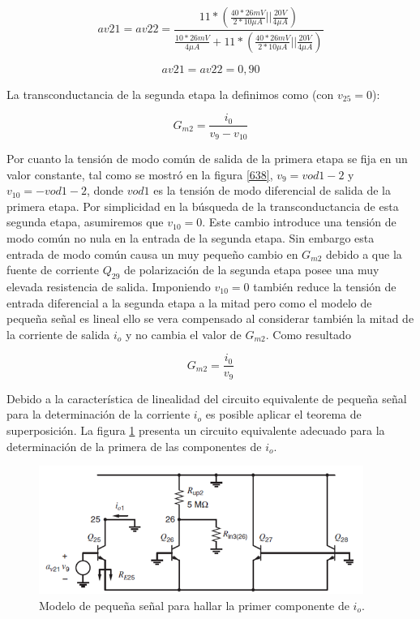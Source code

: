 \documentclass[12pt,a4paper,final,headinclude,footinclude,BCOR5mm]{scrartcl}
\begin{document}
$$av21 = av22 = \frac{11 * (\frac{40*26mV}{2*10 \mu A}||\frac{20V}{4 \mu A})}{\frac{10*26 mV}{4 \mu A} + 11 * (\frac{40*26mV}{2*10 \mu A}||\frac{20V}{4 \mu A})}$$

$$av21 = av22 = 0,90$$

La transconductancia de la segunda etapa la definimos como (con $v_{25} = 0$):

$$G_{m2} = \frac{i_{0}}{v_{9} - v_{10}}$$

Por cuanto la tensión de modo común de salida de la primera etapa se fija en un valor constante, tal como se mostró en la figura \ref{638},  $v_{9} = vod1-2$ y $v_{10} = - vod1-2$, donde $vod1$ es la tensión de modo diferencial de salida de la primera etapa. Por simplicidad en la búsqueda de la transconductancia de esta segunda etapa, asumiremos que $v_{10} = 0$. Este cambio introduce una tensión de modo común no nula en la entrada de la segunda etapa. Sin embargo esta entrada de modo común causa un muy pequeño cambio en $G_{m2}$ debido a que la fuente de corriente $Q_{29}$ de polarización de la segunda etapa posee una muy elevada resistencia de salida. Imponiendo $v_{10} = 0$ también reduce la tensión de entrada diferencial a la segunda etapa a la mitad pero como el modelo de pequeña señal es lineal ello se vera compensado al considerar también la mitad de la corriente de salida $i_{o}$  y no cambia el valor de $G_{m2}$. Como resultado

$$G_{m2} = \frac{i_{0}}{v_{9}}$$

Debido a la característica de linealidad del circuito equivalente de pequeña señal para la determinación de la corriente $i_{o}$ es posible aplicar el teorema de superposición. La figura \ref{646} presenta un circuito equivalente adecuado para la determinación de la primera de las componentes de $i_{o}$.

\begin{figure}[!h]
\begin{center}
\includegraphics[width=300pt]{./imagenes/646.png}
\end{center}
\caption{Modelo de pequeña señal para hallar la primer componente de $i_{o}$.}
\label{646}
\end{figure}
\end{document}
